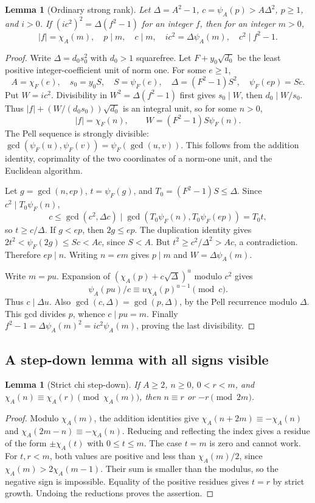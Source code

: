 \documentclass[11pt,a4paper]{article}
\newtheorem{lemma}[theorem]{Lemma}
\theoremstyle{definition}\newtheorem{definition}[theorem]{Definition}
\theoremstyle{remark}\newtheorem{remark}[theorem]{Remark}
\begin{document}
\begin{lemma}[Ordinary strong rank]\label{lem:rank}
Let \(\Delta=A^2-1\), \(c=\psi_A(p)>A\Delta^2\), \(p\ge1\),
and \(i>0\). If \((ic^2)^2=\Delta(f^2-1)\) for an integer \(f\),
then for an integer \(m>0\),
\[
 |f|=\chi_A(m),\quad p\mid m,\quad c\mid m,\quad
 ic^2=\Delta\psi_A(m),\quad c^2\mid f^2-1.
\]
\end{lemma}
\begin{proof}
Write \(\Delta=d_0s_0^2\) with \(d_0>1\) squarefree. Let
\(F+y_0\sqrt{d_0}\) be the least positive integer-coefficient unit
of norm one. For some \(e\ge1\),
\[
 A=\chi_F(e),\quad s_0=y_0S,\quad S=\psi_F(e),\quad
 \Delta=(F^2-1)S^2,\quad \psi_F(ep)=Sc.
\]
Put \(W=ic^2\). Divisibility in \(W^2=\Delta(f^2-1)\) first
gives \(s_0\mid W\), then \(d_0\mid W/s_0\). Thus
\(|f|+(W/(d_0s_0))\sqrt{d_0}\) is an integral unit, so for some
\(n>0\),
\[
 |f|=\chi_F(n),\qquad W=(F^2-1)S\psi_F(n).
\]
The Pell sequence is strongly divisible:
\(\gcd(\psi_F(u),\psi_F(v))=\psi_F(\gcd(u,v))\).
This follows from the addition identity, coprimality of the two
coordinates of a norm-one unit, and the Euclidean algorithm.

Let \(g=\gcd(n,ep)\), \(t=\psi_F(g)\), and
\(T_0=(F^2-1)S\le\Delta\). Since \(c^2\mid T_0\psi_F(n)\),
\[
 c\le\gcd(c^2,\Delta c)
   \mid\gcd(T_0\psi_F(n),T_0\psi_F(ep))=T_0t,
\]
so \(t\ge c/\Delta\). If \(g<ep\), then \(2g\le ep\).
The duplication identity gives
\(2t^2<\psi_F(2g)\le Sc<Ac\), since \(S<A\).
But \(t^2\ge c^2/\Delta^2>Ac\), a contradiction. Therefore
\(ep\mid n\). Writing \(n=em\) gives \(p\mid m\) and
\(W=\Delta\psi_A(m)\).

Write \(m=pu\). Expansion of
\((\chi_A(p)+c\sqrt\Delta)^u\) modulo \(c^2\) gives
\[
 \psi_A(pu)/c\equiv u\chi_A(p)^{u-1}\pmod c.
\]
Thus \(c\mid\Delta u\). Also
\(\gcd(c,\Delta)=\gcd(p,\Delta)\), by the Pell recurrence
modulo \(\Delta\). This gcd divides \(p\), whence \(c\mid pu=m\).
Finally \(f^2-1=\Delta\psi_A(m)^2=ic^2\psi_A(m)\), proving
the last divisibility.
\end{proof}

\subsection{A step-down lemma with all signs visible}

\begin{lemma}[Strict chi step-down]\label{lem:stepdown}
If \(A\ge2\), \(n\ge0\), \(0<r<m\), and
\(\chi_A(n)\equiv\chi_A(r)\pmod{\chi_A(m)}\), then
\(n\equiv r\) or \(-r\pmod{2m}\).
\end{lemma}
\begin{proof}
Modulo \(\chi_A(m)\), the addition identities give
\(\chi_A(n+2m)\equiv-\chi_A(n)\) and
\(\chi_A(2m-n)\equiv-\chi_A(n)\). Reducing and reflecting the
index gives a residue of the form \(\pm\chi_A(t)\) with
\(0\le t\le m\). The case \(t=m\) is zero and cannot work.
For \(t,r<m\), both values are positive and less than
\(\chi_A(m)/2\), since \(\chi_A(m)>2\chi_A(m-1)\).
Their sum is smaller than the modulus, so the negative sign is
impossible. Equality of the positive residues gives \(t=r\) by
strict growth. Undoing the reductions proves the assertion.
\end{proof}
\end{document}
